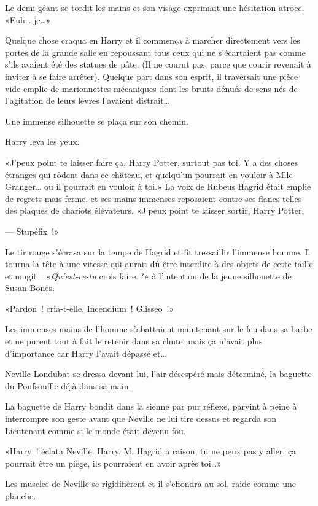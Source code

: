 Le demi-géant se tordit les mains et son visage exprimait une hésitation atroce. «Euh… je…»

Quelque chose craqua en Harry et il commença à marcher directement vers les portes de la grande salle en repoussant tous ceux qui ne s'écartaient pas comme s'ils avaient été des statues de pâte. (Il ne courut pas, parce que courir revenait à inviter à se faire arrêter). Quelque part dans son esprit, il traversait une pièce vide emplie de marionnettes mécaniques dont les bruits dénués de sens nés de l'agitation de leurs lèvres l'avaient distrait…

Une immense silhouette se plaça sur son chemin.

Harry leva les yeux.

«J'peux point te laisser faire ça, Harry Potter, surtout pas toi. Y a des choses étranges qui rôdent dans ce château, et quelqu'un pourrait en vouloir à Mlle Granger… ou il pourrait en vouloir à toi.» La voix de Rubeus Hagrid était emplie de regrets mais ferme, et ses mains immenses reposaient contre ses flancs telles des plaques de chariots élévateurs. «J'peux point te laisser sortir, Harry Potter.

--- Stupéfix~!»

Le tir rouge s'écrasa sur la tempe de Hagrid et fit tressaillir l'immense homme. Il tourna la tête à une vitesse qui aurait dû être interdite à des objets de cette taille et mugit~: «\emph{Qu'est-ce-tu} crois faire~?» à l'intention de la jeune silhouette de Susan Bones.

«Pardon~! cria-t-elle. Incendium~! Glisseo~!»

Les immenses mains de l'homme s'abattaient maintenant sur le feu dans sa barbe et ne purent tout à fait le retenir dans sa chute, mais ça n'avait plus d'importance car Harry l'avait dépassé et…

Neville Londubat se dressa devant lui, l'air désespéré mais déterminé, la baguette du Poufsouffle déjà dans sa main.

La baguette de Harry bondit dans la sienne par pur réflexe, parvint à peine à interrompre son geste avant que Neville ne lui tire dessus et regarda son Lieutenant comme si le monde était devenu fou.

«Harry~! éclata Neville. Harry, M. Hagrid a raison, tu ne peux pas y aller, ça pourrait être un piège, ils pourraient en avoir après toi…»

Les muscles de Neville se rigidifièrent et il s'effondra au sol, raide comme une planche.

